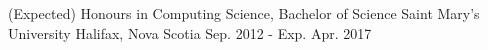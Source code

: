 \documentclass[11pt, a4paper]{awesome-cv}
\begin{document}
\begin{cventries}
\end{cventries}

% 


\begin{cventries}

  \cventry
    {(Expected) Honours in Computing Science, Bachelor of Science} %
    {Saint Mary's University} %
    {Halifax, Nova Scotia} %
    {Sep. 2012 - Exp. Apr. 2017} %
    {
    }

\end{cventries}

% 
% 


\end{document}
